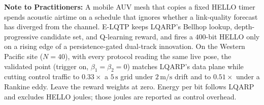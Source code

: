 \noindent\textbf{Note to Practitioners:}
A mobile AUV mesh that copies a fixed HELLO timer spends acoustic
airtime on a schedule that ignores whether a link-quality forecast
has diverged from the channel.
E-LQTP keeps LQARP's Bellhop lookup, depth-progressive candidate
set, and Q-learning reward, and fires a $400$-bit HELLO only on a
rising edge of a persistence-gated dual-track innovation.
On the Western Pacific site ($N=40$), with every protocol reading
the same live pose, the validated point (trigger on,
$\beta_1=\beta_2=0$) matches LQARP's data plane while cutting
control traffic to $0.33\times$ a $5\,\mathrm{s}$ grid under
$2\,\mathrm{m/s}$ drift and to $0.51\times$ under a Rankine eddy.
Leave the reward weights at zero.
Energy per bit follows LQARP and excludes HELLO joules; those joules
are reported as control overhead.
